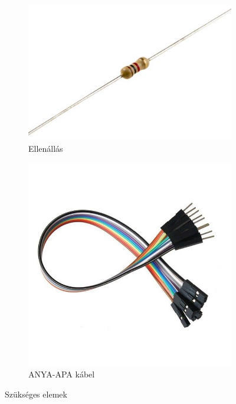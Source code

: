 \documentclass[a4paper,12pt]{report}
\begin{document}
\begin{figure}[h!]
\begin{subfigure}[b]{0.4\linewidth}
    \end{subfigure}
    \begin{subfigure}[b]{0.4\linewidth}
        \includegraphics[width=\linewidth]{images/ellenallas.jpg}
        \caption{Ellenállás}
    \end{subfigure}
    \begin{subfigure}[b]{0.4\linewidth}
        \includegraphics[width=\linewidth]{images/anyaapa.jpg}
        \caption{ANYA-APA kábel}
    \end{subfigure}
    \caption{Szükséges elemek}
    \label{fig:lampaelemek}
\end{figure}
\end{document}
